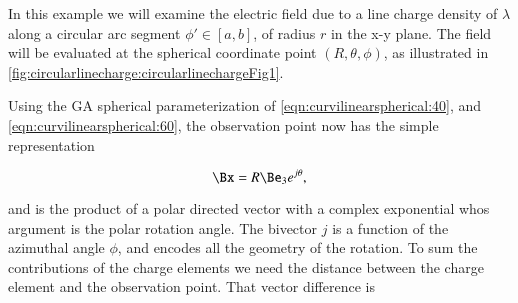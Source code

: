%
%
In this example we will examine the electric field due to a line charge density of \( \lambda \) along a circular arc segment \( \phi' \in [a,b] \), of radius \( r \) in the x-y plane.
The field will be evaluated at the
spherical coordinate point \( (R, \theta, \phi) \), as illustrated in \cref{fig:circularlinecharge:circularlinechargeFig1}.


Using the GA spherical parameterization of \cref{eqn:curvilinearspherical:40}, and \cref{eqn:curvilinearspherical:60}, the
%
%
%
%
observation point now has the simple representation

\begin{dmath}\label{eqn:circularlinecharge:60}
\Bx = R \Be_3 e^{j \theta },
\end{dmath}

and is the product of a polar directed vector with a complex exponential whos argument is the polar rotation angle.
The bivector \( j \) is a function of the azimuthal angle \( \phi \), and encodes all the geometry of the rotation.
To sum the contributions of the charge elements we need the distance between the charge element and the observation point.  That vector difference is

